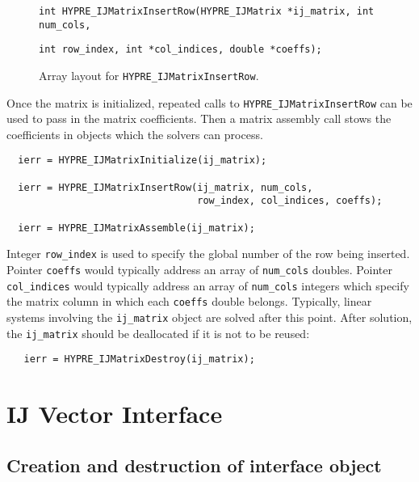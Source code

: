 \begin{figure}
\label{insert_row}
\centerline{}
\vspace{0.15in}
\parbox{6.5in}{\hspace{0.5in}
  {\tt int HYPRE\_IJMatrixInsertRow(HYPRE\_IJMatrix *ij\_matrix,
   int num\_cols, }}
\parbox{6.5in}{\hspace{1.5in}
  {\tt int row\_index, int *col\_indices, double *coeffs);}}
\vspace{0.in}
\caption{Array layout for {\tt HYPRE\_IJMatrixInsertRow}.}
\end{figure}

Once the matrix is initialized, repeated calls to
\verb+HYPRE_IJMatrixInsertRow+ can be used to pass in
the matrix coefficients.  Then a matrix assembly call stows
the coefficients in objects which the solvers can process. 

\begin{verbatim}
  ierr = HYPRE_IJMatrixInitialize(ij_matrix);

  ierr = HYPRE_IJMatrixInsertRow(ij_matrix, num_cols,
                                 row_index, col_indices, coeffs);

  ierr = HYPRE_IJMatrixAssemble(ij_matrix);
\end{verbatim}

\noindent Integer \verb+row_index+ is used to specify the global
number of the row being inserted.
\noindent Pointer \verb+coeffs+ would typically address an array of
\verb+num_cols+ doubles.
Pointer \verb+col_indices+ would typically
address an array of \verb+num_cols+ integers which specify the
matrix column in which each \verb+coeffs+ double belongs.  
Typically, linear systems involving the \verb+ij_matrix+
object are solved after this point.  After solution, the
\verb+ij_matrix+ should be deallocated if it is not to be reused:

\begin{verbatim}
   ierr = HYPRE_IJMatrixDestroy(ij_matrix);
\end{verbatim}

\section{IJ Vector Interface}

\subsection{Creation and destruction of interface object}

